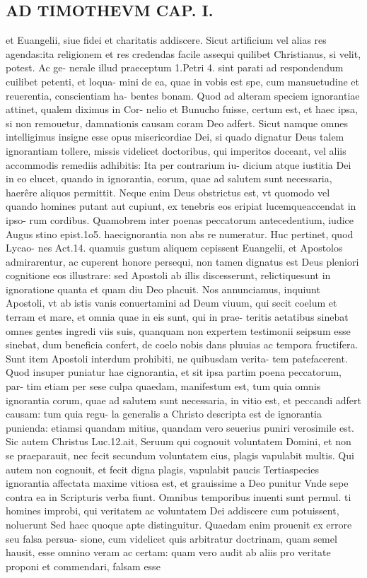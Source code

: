 \documentclass{article}
\begin{document}
\begin{pages}
\section*{AD TIMOTHEVM CAP. I. }
\marginpar{[ p.42 ]}\pstart et Euangelii, siue fidei et charitatis addiscere. Sicut artificium vel alias res agendas:ita religionem et res credendas facile assequi quilibet Christianus, si velit, potest. Ac ge- nerale illud praeceptum 1.Petri 4. sint parati ad respondendum cuilibet petenti, et loqua- mini de ea, quae in vobis est spe, cum mansuetudine et reuerentia, conscientiam ha- bentes bonam. Quod ad alteram speciem ignorantiae attinet, qualem diximus in Cor- nelio et Bunucho fuisse, certum est, et haec ipsa, si non remouetur, damnationis causam coram Deo adfert. Sicut namque  omnes intelligimus insigne esse opus misericordiae Dei, si quado dignatur Deus talem ignorantiam tollere, missis videlicet doctoribus, qui imperitos doceant, vel aliis accommodis remediis adhibitis: Ita per contrarium iu- dicium atque  iustitia Dei in eo elucet, quando in ignorantia, eorum, quae ad salutem sunt necessaria, haerêre aliquos permittit. Neque  enim Deus obstrictus est, vt quomodo vel quando homines putant aut cupiunt, ex tenebris eos eripiat lucemqueaccendat in ipso- rum cordibus. Quamobrem inter poenas peccatorum antecedentium, iudice Augus stino epist.1o5. haecignorantia non abs re numeratur. Huc pertinet, quod Lycao- nes Act.14. quamuis gustum aliquem cepissent Euangelii, et Apostolos admirarentur, ac cuperent honore persequi, non tamen dignatus est Deus pleniori cognitione eos illustrare: sed Apostoli ab illis discesserunt, relictiquesunt in ignoratione quanta et quam   diu Deo placuit. Nos annunciamus, inquiunt Apostoli, vt ab istis vanis conuertamini ad   Deum viuum, qui secit coelum et terram et mare, et omnia quae in eis sunt, qui in prae-   teritis aetatibus sinebat omnes gentes ingredi viis suis, quanquam non expertem   testimonii seipsum esse sinebat, dum beneficia confert, de coelo nobis dans pluuias ac   tempora fructifera. Sunt item Apostoli interdum prohibiti, ne quibusdam verita-   tem patefacerent.  \pend\pstart Quod insuper puniatur hae cignorantia, et sit ipsa partim poena peccatorum, par- tim etiam per sese culpa quaedam, manifestum est, tum quia omnis ignorantia corum, quae ad salutem sunt necessaria, in vitio est, et peccandi adfert causam: tum quia regu- la generalis a Christo descripta est de ignorantia punienda: etiamsi quandam mitius, quandam vero seuerius puniri verosimile est. Sic autem Christus Luc.12.ait, Seruum qui cognouit voluntatem Domini, et non se praeparauit, nec fecit secundum voluntatem eius, plagis vapulabit multis. Qui autem non cognouit, et fecit digna plagis, vapulabit paucis  \pend\pstart Tertiaspecies ignorantia affectata maxime vitiosa est, et grauissime a Deo punitur Vnde sepe contra ea in Scripturis verba fiunt. Omnibus temporibus inuenti sunt permul. ti homines improbi, qui veritatem ac voluntatem Dei addiscere cum potuissent, noluerunt Sed haec quoque  apte distinguitur. Quaedam enim prouenit ex errore seu falsa persua- sione, cum videlicet quis arbitratur doctrinam, quam semel hausit, esse omnino veram ac certam: quam vero audit ab aliis pro veritate proponi et commendari, falsam esse 
\end{pages}
\end{document}
